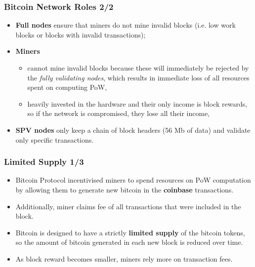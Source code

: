 \documentclass{beamer}
\begin{document}
\begin{frame}
  \frametitle{Bitcoin Network Roles 2/2}
  \begin{itemize}
  \item \textbf{Full nodes} ensure that miners do not mine invalid blocks
    (i.e. low work blocks or blocks with invalid transactions);
  \item \textbf{Miners}
    \begin{itemize}
    \item cannot mine invalid blocks because these will immediately be rejected
      by the \textit{fully validating nodes}, which results in immediate loss of
      all resources spent on computing PoW,
    \item heavily invested in the hardware and their only income is block
      rewards, so if the network is compromised, they lose all their income,
    \end{itemize}
  \item \textbf{SPV nodes} only keep a chain of block headers (56 Mb of data)
    and validate only specific transactions.
  \end{itemize}
\end{frame}

\begin{frame}
  \frametitle{Limited Supply 1/3}
  \begin{itemize}
  \item Bitcoin Protocol incentivised miners to spend resources on PoW
    computation by allowing them to generate new bitcoin in the
  \textbf{coinbase} transactions.
  \item Additionally, miner claims fee of all transactions that were included in
    the block.
  \item Bitcoin is designed to have a strictly \textbf{limited supply} of the
    bitcoin tokens, so the amount of bitcoin generated in each new block is
    reduced over time.
  \item As block reward becomes smaller, miners rely more on transaction fees.
  \end{itemize}
\end{frame}
\end{document}
